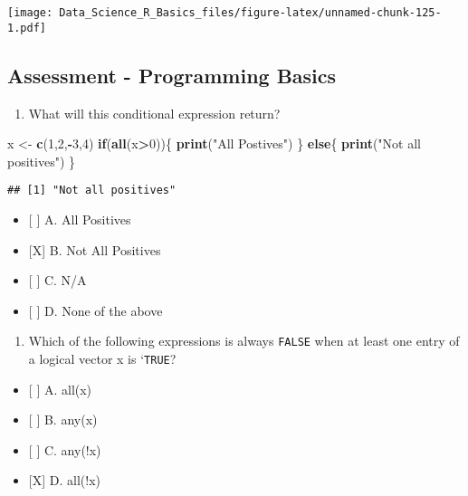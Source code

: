 \documentclass[]{article}
\newenvironment{Shaded}{\begin{snugshade}}{\end{snugshade}}
\newcommand{\ControlFlowTok}[1]{\textcolor[rgb]{0.13,0.29,0.53}{\textbf{#1}}}
\newcommand{\DecValTok}[1]{\textcolor[rgb]{0.00,0.00,0.81}{#1}}
\newcommand{\KeywordTok}[1]{\textcolor[rgb]{0.13,0.29,0.53}{\textbf{#1}}}
\newcommand{\NormalTok}[1]{#1}
\newcommand{\OperatorTok}[1]{\textcolor[rgb]{0.81,0.36,0.00}{\textbf{#1}}}
\newcommand{\StringTok}[1]{\textcolor[rgb]{0.31,0.60,0.02}{#1}}
\providecommand{\tightlist}{%
  \setlength{\itemsep}{0pt}\setlength{\parskip}{0pt}}
\begin{document}
\texttt{[image: Data\_Science\_R\_Basics\_files/figure-latex/unnamed-chunk-125-1.pdf]}

\hypertarget{assessment---programming-basics}{%
\subsection{Assessment - Programming
Basics}\label{assessment---programming-basics}}

\begin{enumerate}
\def\labelenumi{\arabic{enumi}.}
\tightlist
\item
  What will this conditional expression return?
\end{enumerate}

\begin{Shaded}
\begin{Highlighting}[]
\NormalTok{x <-}\StringTok{ }\KeywordTok{c}\NormalTok{(}\DecValTok{1}\NormalTok{,}\DecValTok{2}\NormalTok{,}\OperatorTok{-}\DecValTok{3}\NormalTok{,}\DecValTok{4}\NormalTok{)}
\ControlFlowTok{if}\NormalTok{(}\KeywordTok{all}\NormalTok{(x}\OperatorTok{>}\DecValTok{0}\NormalTok{))\{}
\KeywordTok{print}\NormalTok{(}\StringTok{"All Postives"}\NormalTok{)}
\NormalTok{\} }\ControlFlowTok{else}\NormalTok{\{}
\KeywordTok{print}\NormalTok{(}\StringTok{"Not all positives"}\NormalTok{)}
\NormalTok{\}}
\end{Highlighting}
\end{Shaded}

\begin{verbatim}
## [1] "Not all positives"
\end{verbatim}

\begin{itemize}
\tightlist
\item
  {[} {]} A. All Positives
\item
  {[}X{]} B. Not All Positives
\item
  {[} {]} C. N/A
\item
  {[} {]} D. None of the above
\end{itemize}

\begin{enumerate}
\def\labelenumi{\arabic{enumi}.}
\setcounter{enumi}{1}
\tightlist
\item
  Which of the following expressions is always \texttt{FALSE} when at
  least one entry of a logical vector x is `\texttt{TRUE}?
\end{enumerate}

\begin{itemize}
\tightlist
\item
  {[} {]} A. all(x)
\item
  {[} {]} B. any(x)
\item
  {[} {]} C. any(!x)
\item
  {[}X{]} D. all(!x)
\end{itemize}
\end{document}
